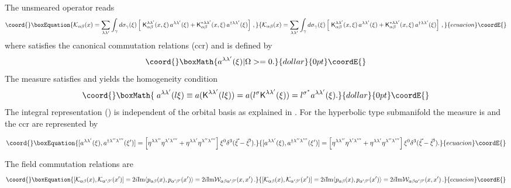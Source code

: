 \documentclass[a4paper,11pt,showpacs,preprintnumbers]{revtex4}
\def\K{\textsf{K}}
\begin{document}
The unsmeared operator reads
\begin{equation}\coord{}\boxEquation{\label{eq:field}
{\cal K}_{\alpha\beta}(x)= \sum_{\lambda \lambda'}\int_{\gamma}
d\sigma_{\gamma}(\xi) \left[ \;{\cal
\K}_{\alpha\beta}^{\lambda\lambda'}(x,\xi)\,
a^{\lambda\lambda'}(\xi) +{\cal
\K}_{\alpha\beta}^{*\lambda\lambda'} (x,\xi)\,
a^{\dagger\lambda\lambda'}(\xi)\right]\,,
}{{\cal K}_{\alpha\beta}(x)= \sum_{\lambda \lambda'}\int_{\gamma}
d\sigma_{\gamma}(\xi) \left[ \;{\cal
\K}_{\alpha\beta}^{\lambda\lambda'}(x,\xi)\,
a^{\lambda\lambda'}(\xi) +{\cal
\K}_{\alpha\beta}^{*\lambda\lambda'} (x,\xi)\,
a^{\dagger\lambda\lambda'}(\xi)\right]\,,
}{ecuacion}\coordE{}\end{equation}
where \coordHE{} satisfies the canonical
commutation relations (ccr) and is defined by
$$\coord{}\boxMath{a^{\lambda\lambda'}(\xi)|\Omega>=0.}{dollar}{0pt}\coordE{}$$
The measure satisfies
\coordHE{} and
\myHighlight{${\K}^{\lambda\lambda'}_{\alpha\beta}(x,l
\xi)=l^{\sigma}{\K}^{\lambda\lambda'}_{\alpha\beta}(x,\xi)$}\coordHE{} yields
the homogeneity condition
$$\coord{}\boxMath{ \;a^{\lambda\lambda'}(l \xi)\equiv a(\K^{\lambda\lambda'}(l\xi))=a(l^{\sigma}\K^{\lambda\lambda'}(\xi))
=l ^{\sigma^{*}}a^{\lambda\lambda'}(\xi).}{dollar}{0pt}\coordE{}$$ The integral
representation (\myHighlight{$\ref{eq:field}$}\coordHE{}) is independent of the orbital
basis \myHighlight{$\gamma$}\coordHE{} as explained in \cite{brmo}.  For the hyperbolic
type submanifold \coordHE{} the measure is
\coordHE{} and the ccr are
represented by

\begin{equation}\coord{}\boxEquation{
[a^{\lambda\lambda'}(\xi),a^{\dagger\lambda''\lambda'''}(\xi')]=
\left[\eta^{\lambda\lambda''}\eta^{\lambda'\lambda'''}
+\eta^{\lambda\lambda'}\eta^{\lambda''\lambda'''}\right]\xi^0\delta^3(\vec\xi-\vec\xi').
}{
[a^{\lambda\lambda'}(\xi),a^{\dagger\lambda''\lambda'''}(\xi')]=
\left[\eta^{\lambda\lambda''}\eta^{\lambda'\lambda'''}
+\eta^{\lambda\lambda'}\eta^{\lambda''\lambda'''}\right]\xi^0\delta^3(\vec\xi-\vec\xi').
}{ecuacion}\coordE{}\end{equation}


The field commutation relations are
\begin{equation}\coord{}\boxEquation{
\left[{\cal K}_{\alpha\beta}(x),{\cal
K}_{\alpha'\beta'}(x')\right]=2i \mbox{Im} \langle
p_{\alpha\beta}(x),p_{\alpha'\beta'}(x')\rangle=2i \mbox{Im}{\cal
W}_{\alpha\beta\alpha'\beta'}(x,x') \,.
}{
\left[{\cal K}_{\alpha\beta}(x),{\cal
K}_{\alpha'\beta'}(x')\right]=2i \mbox{Im} \langle
p_{\alpha\beta}(x),p_{\alpha'\beta'}(x')\rangle=2i \mbox{Im}{\cal
W}_{\alpha\beta\alpha'\beta'}(x,x') \,.
}{ecuacion}\coordE{}\end{equation}
\end{document}
